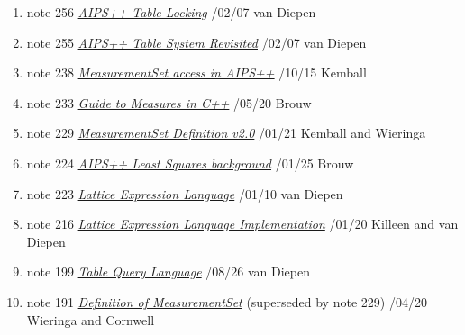 %

\begin{enumerate}

\item
note 256
\href{256.html}{\textit{AIPS++ Table Locking}}
/02/07 van Diepen

\item
note 255
\href{255.html}{\textit{AIPS++ Table System Revisited}}
/02/07 van Diepen

\item
note 238
\href{238.html}{\textit{MeasurementSet access in AIPS++}}
/10/15 Kemball

\item
note 233
\href{233.html}{\textit{Guide to Measures in C++}}
/05/20 Brouw

\item
note 229
\href{229.html}{\textit{MeasurementSet Definition v2.0}}
/01/21 Kemball and Wieringa

\item
note 224
\href{224.html}{\textit{AIPS++ Least Squares background}}
/01/25 Brouw

\item
note 223
\href{223.html}{\textit{Lattice Expression Language}}
/01/10 van Diepen

\item
note 216
\href{216.html}{\textit{Lattice Expression Language Implementation}}
/01/20 Killeen and van Diepen

\item
note 199
\href{199.html}{\textit{Table Query Language}}
/08/26 van Diepen

\item
note 191
\href{191.html}{\textit{Definition of MeasurementSet}} (superseded by
  note 229)
/04/20 Wieringa and Cornwell

\end{enumerate}
